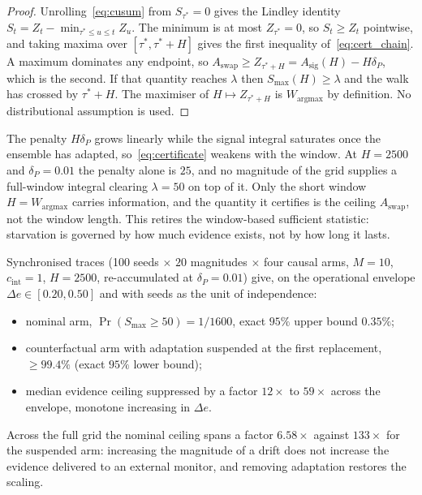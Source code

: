 \documentclass[smallextended]{svjour3}
\newcommand{\SixSeeds}{100}                  %
\newcommand{\SixHorizon}{2500}               %
\newcommand{\DeltaPtext}{0.01}               %
\newcommand{\FullSpreadGrid}{6.58}           %
\newcommand{\FrozenSpreadGrid}{133}          %
\newcommand{\SuppressLo}{12}                 %
\newcommand{\SuppressHi}{59}                 %
\newcommand{\StarvFullK}{1}                  %
\newcommand{\StarvFullN}{1600}               %
\newcommand{\StarvFullUpper}{0.35}           %
\newcommand{\StarvFrozenLower}{99.4}         %
\newcommand{\EnvLo}{0.20}\newcommand{\EnvHi}{0.40}
\begin{document}
\begin{proof}
  Unrolling~\eqref{eq:cusum} from $S_{\tau^*} = 0$ gives the Lindley identity $S_t = Z_t - \min_{\tau^* \le u \le t} Z_u$. The minimum is at most $Z_{\tau^*} = 0$, so $S_t \ge Z_t$ pointwise, and taking maxima over $[\tau^*, \tau^*+H]$ gives the first inequality of~\eqref{eq:cert_chain}. A maximum dominates any endpoint, so $A_{\mathrm{swap}} \ge Z_{\tau^*+H} = A_{\mathrm{sig}}(H) - H\delta_P$, which is the second. If that quantity reaches $\lambda$ then $S_{\max}(H) \ge \lambda$ and the walk has crossed by $\tau^*+H$. The maximiser of $H \mapsto Z_{\tau^*+H}$ is $W_{\mathrm{argmax}}$ by definition. No distributional assumption is used.
\end{proof}

\begin{remark}\label{rem:shortwindow}
  The penalty $H\delta_P$ grows linearly while the signal integral saturates once the ensemble has adapted, so~\eqref{eq:certificate} weakens with the window. At $H = \SixHorizon$ and $\delta_P = \DeltaPtext$ the penalty alone is $25$, and no magnitude of the grid supplies a full-window integral clearing $\lambda = 50$ on top of it. Only the short window $H = W_{\mathrm{argmax}}$ carries information, and the quantity it certifies is the ceiling $A_{\mathrm{swap}}$, not the window length. This retires the window-based sufficient statistic: starvation is governed by how much evidence exists, not by how long it lasts.
\end{remark}

\begin{empresult}\label{res:starvation}
  Synchronised traces (\SixSeeds{} seeds $\times$ $20$ magnitudes $\times$ four causal arms, $M = 10$, $c_{\mathrm{int}} = 1$, $H = \SixHorizon$, re-accumulated at $\delta_P = \DeltaPtext$) give, on the operational envelope $\Delta e \in [\EnvLo, 0.50]$ and with seeds as the unit of independence:
  \begin{itemize}[leftmargin=*,topsep=2pt,itemsep=1pt]
    \item nominal arm, $\Pr(S_{\max} \ge 50) = \StarvFullK/\StarvFullN$, exact $95\%$ upper bound $\StarvFullUpper\%$;
    \item counterfactual arm with adaptation suspended at the first replacement, $\ge \StarvFrozenLower\%$ (exact $95\%$ lower bound);
    \item median evidence ceiling suppressed by a factor $\SuppressLo\times$ to $\SuppressHi\times$ across the envelope, monotone increasing in $\Delta e$.
  \end{itemize}
  Across the full grid the nominal ceiling spans a factor $\FullSpreadGrid\times$ against $\FrozenSpreadGrid\times$ for the suspended arm: increasing the magnitude of a drift does not increase the evidence delivered to an external monitor, and removing adaptation restores the scaling.
\end{empresult}
\end{document}

